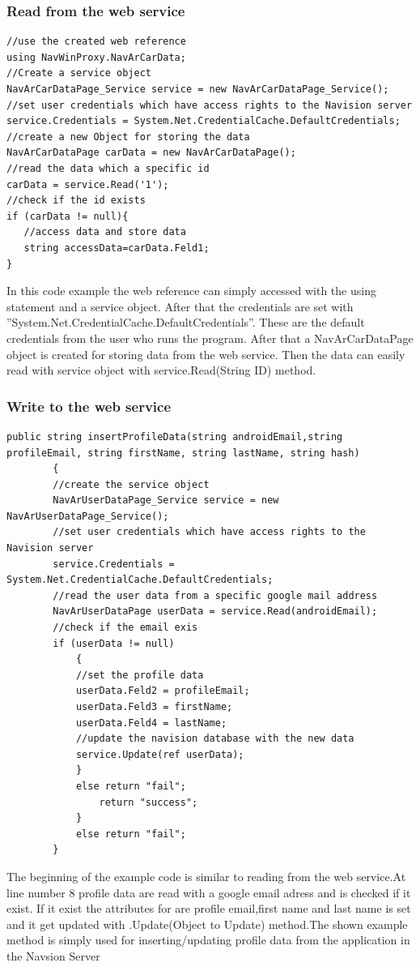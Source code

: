 \subsubsection{Read from the web service}
\begin{lstlisting}[caption=Example reading webservice,captionpos=b]
//use the created web reference
using NavWinProxy.NavArCarData;
//Create a service object
NavArCarDataPage_Service service = new NavArCarDataPage_Service();
//set user credentials which have access rights to the Navision server
service.Credentials = System.Net.CredentialCache.DefaultCredentials;
//create a new Object for storing the data
NavArCarDataPage carData = new NavArCarDataPage();                
//read the data which a specific id
carData = service.Read('1');
//check if the id exists
if (carData != null){
   //access data and store data
   string accessData=carData.Feld1;
}
\end{lstlisting}      

In this code example the web reference can simply accessed with the using statement and a service object. After that the credentials are set with ''System.Net.CredentialCache.DefaultCredentials''.
These are the default credentials from the user who runs the program. After that a  NavArCarDataPage object is created for storing data from the web service. Then the data can easily read with service object with service.Read(String ID)  method.
\newpage
\subsubsection{Write to the web service}
\begin{lstlisting}[caption=Example writing to web service,captionpos=b]
 public string insertProfileData(string androidEmail,string profileEmail, string firstName, string lastName, string hash)
        {
        //create the service object
        NavArUserDataPage_Service service = new NavArUserDataPage_Service();
        //set user credentials which have access rights to the Navision server
        service.Credentials = System.Net.CredentialCache.DefaultCredentials;
        //read the user data from a specific google mail address
        NavArUserDataPage userData = service.Read(androidEmail);
        //check if the email exis 
        if (userData != null)
            {
            //set the profile data
            userData.Feld2 = profileEmail;
            userData.Feld3 = firstName;
            userData.Feld4 = lastName;
            //update the navision database with the new data
            service.Update(ref userData);
            }
            else return "fail";
                return "success";
            }
            else return "fail";
        }
\end{lstlisting}
The beginning of the example code is similar to reading from the web service.At line number 8 profile data are read with a google email adress and is checked if it exist. If it exist the attributes for are profile email,first name and last name is set and it get updated with .Update(Object to Update) method.The shown example method is simply used for inserting/updating profile data from the application in the Navsion Server 
  
